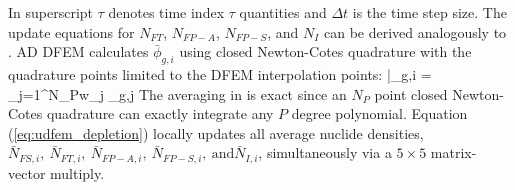 In  superscript $\tau$ denotes time index $\tau$ quantities and $\Delta t$ is the time step size.
The update equations for $N_{FT}$, $N_{FP-A}$, $N_{FP-S}$, and $N_I$ can be derived analogously to .
AD DFEM calculates $\bar{\phi}_{g,i}$ using closed Newton-Cotes quadrature with the quadrature points limited to the DFEM interpolation points:
\benum
\label{eq:avg}
\bar{\phi}_{g,i} = \sum_{j=1}^{N_P}{w_j \phi_{g,j} } \pep
\eenum
The averaging in  is exact since an $N_P$ point closed Newton-Cotes quadrature can exactly integrate any $P$ degree polynomial.
Equation (\ref{eq:udfem_depletion}) locally updates all average nuclide densities, $\bar{N}_{FS,i},~\bar{N}_{FT,i},~\bar{N}_{FP-A,i},~\bar{N}_{FP-S,i},~\text{and} \bar{N}_{I,i}$, simultaneously via a $5\times5$ matrix-vector multiply.

